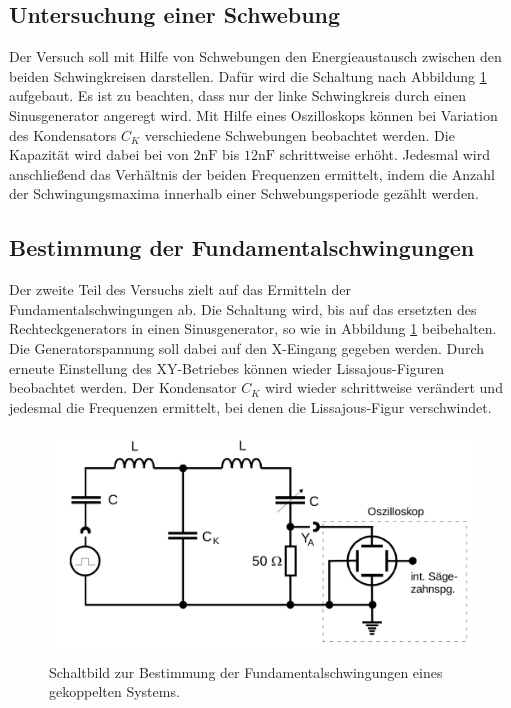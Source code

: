 \subsection{Untersuchung einer Schwebung} 
\label{sub:Untersuchung einer Schwebung}



Der Versuch soll mit Hilfe von Schwebungen den Energieaustausch zwischen den beiden Schwingkreisen darstellen.
Dafür wird die Schaltung nach Abbildung \ref{fig:bild6} aufgebaut. Es ist zu beachten, dass nur der linke Schwingkreis durch einen Sinusgenerator angeregt wird.
Mit Hilfe eines Oszilloskops können bei Variation des 
Kondensators $C_K$ verschiedene Schwebungen beobachtet werden. Die Kapazität wird dabei bei von $2\si{\nano\farad}$  bis $12\si{\nano\farad}$
schrittweise erhöht. Jedesmal wird anschließend das Verhältnis der beiden Frequenzen ermittelt, indem die Anzahl der Schwingungsmaxima innerhalb einer Schwebungsperiode 
gezählt werden.


\subsection{Bestimmung der Fundamentalschwingungen}
\label{sub:Bestimmung der Fundamentalschwingungen}



Der zweite Teil des Versuchs zielt auf das Ermitteln der Fundamentalschwingungen ab. Die Schaltung wird, bis auf das ersetzten des Rechteckgenerators in
einen Sinusgenerator, so wie in Abbildung \ref{fig:bild6} beibehalten. Die Generatorspannung soll dabei auf den X-Eingang gegeben werden.
Durch erneute Einstellung des XY-Betriebes können wieder Lissajous-Figuren beobachtet werden. Der Kondensator $C_K$ wird wieder schrittweise verändert und jedesmal die Frequenzen ermittelt, bei 
denen die Lissajous-Figur verschwindet. 


\begin{figure}

    \centering
    \includegraphics[height=6.0cm]{data/Bild6.png}
    \caption{Schaltbild zur Bestimmung der Fundamentalschwingungen eines gekoppelten Systems.}
    \label{fig:bild6}
\end{figure}


